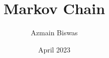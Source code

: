 \documentclass[]{report}
\title{Markov Chain}
\author{Azmain Biswas}
\date{April 2023}
\theoremstyle{remark}
\begin{document}



\tableofcontents









\nocite{*}


\appendix

\end{document}
